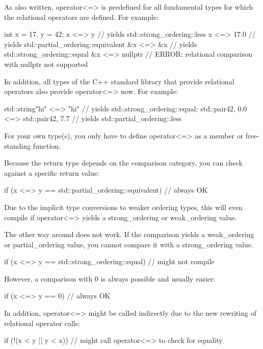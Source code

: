 As also written, operator<=> is predefined for all fundamental types for which the relational operators are defined. For example:

\begin{cpp}
int x = 17, y = 42;
x <=> y // yields std::strong_ordering::less
x <=> 17.0 // yields std::partial_ordering::equivalent
&x <=> &x // yields std::strong_ordering::equal
&x <=> nullptr // ERROR: relational comparison with nullptr not supported
\end{cpp}

In addition, all types of the C++ standard library that provide relational operators also provide operator<=> now. For example:

\begin{cpp}
std::string{"hi"} <=> "hi" // yields std::strong_ordering::equal;
std::pair{42, 0.0} <=> std::pair{42, 7.7} // yields std::partial_ordering::less
\end{cpp}

For your own type(s), you only have to define operator<=> as a member or free-standing function.

Because the return type depends on the comparison category, you can check against a specific return value:

\begin{cpp}
if (x <=> y == std::partial_ordering::equivalent) // always OK
\end{cpp}

Due to the implicit type conversions to weaker ordering types, this will even compile if operator<=> yields a strong\_ordering or weak\_ordering value.

The other way around does not work. If the comparison yields a weak\_ordering or partial\_ordering value, you cannot compare it with a strong\_ordering value.

\begin{cpp}
if (x <=> y == std::strong_ordering::equal) // might not compile
\end{cpp}

However, a comparison with 0 is always possible and usually easier:

\begin{cpp}
if (x <=> y == 0) // always OK
\end{cpp}

In addition, operator<=> might be called indirectly due to the new rewriting of relational operator calls:

\begin{cpp}
if (!(x < y || y < x)) // might call operator<=> to check for equality
\end{cpp}

